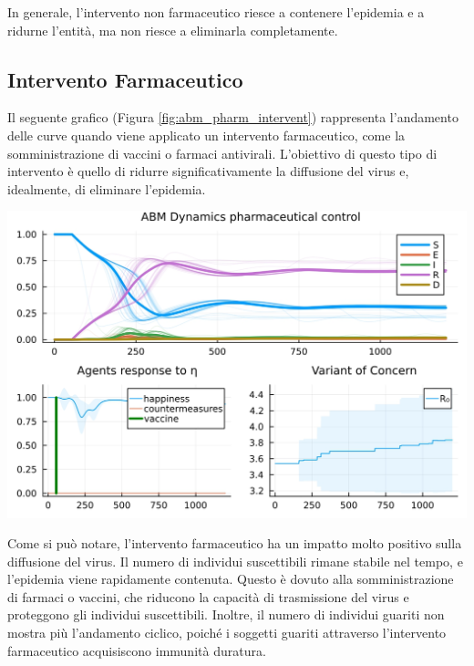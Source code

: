 In generale, l'intervento non farmaceutico riesce a contenere 
l'epidemia e a ridurne l'entità, ma non riesce a eliminarla 
completamente.
\newpage

\subsection{Intervento Farmaceutico}

Il seguente grafico (Figura \ref{fig:abm_pharm_intervent}) 
rappresenta l'andamento delle curve quando viene applicato un 
intervento farmaceutico, come la somministrazione di vaccini o 
farmaci antivirali. L'obiettivo di questo tipo di intervento è 
quello di ridurre significativamente la diffusione del virus e, 
idealmente, di eliminare l'epidemia.

\begin{minipage}{\linewidth}
    \centering
    \includegraphics[width=\textwidth]{img/SocialNetworkABM_VACCINE.jpg}
    \label{fig:abm_pharm_intervent}
\end{minipage}

Come si può notare, l'intervento farmaceutico ha un impatto 
molto positivo sulla diffusione del virus. Il numero di individui 
suscettibili rimane stabile nel tempo, e l'epidemia viene rapidamente 
contenuta. Questo è dovuto alla somministrazione di farmaci o vaccini, 
che riducono la capacità di trasmissione del virus e proteggono gli 
individui suscettibili. Inoltre, il numero di individui guariti non 
mostra più l'andamento ciclico, poiché i soggetti guariti attraverso 
l'intervento farmaceutico acquisiscono immunità duratura.

